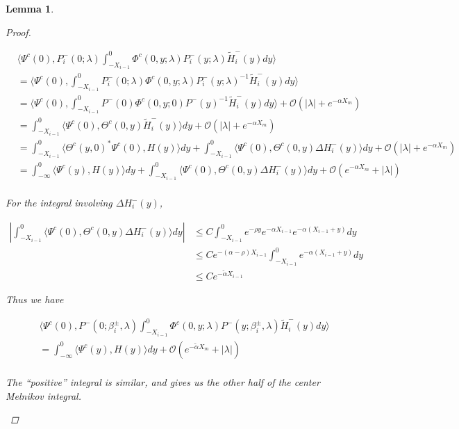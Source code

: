 \documentclass[12pt]{article}
\newtheorem{lemma}{Lemma}
\begin{document}
\begin{lemma}
\begin{proof}
\begin{enumerate}
\begin{align*}
&\langle \Psi^c(0), P_i^-(0; \lambda) \int_{-X_{i-1}}^0 \Phi^c(0, y; \lambda) P_i^-(y; \lambda) \tilde{H}_i^-(y) dy \rangle \\
&= \langle \Psi^c(0), \int_{-X_{i-1}}^0 P_i^-(0; \lambda) \Phi^c(0, y; \lambda) P_i^-(y; \lambda)^{-1} \tilde{H}_i^-(y) dy \rangle \\
&= \langle \Psi^c(0), \int_{-X_{i-1}}^0 P^-(0) \Phi^c(0, y; 0) P^-(y)^{-1} \tilde{H}_i^-(y) dy \rangle + \mathcal{O}(|\lambda| + e^{-\alpha X_m}) \\
&= \int_{-X_{i-1}}^0 \langle \Psi^c(0), \Theta^c(0, y) \tilde{H}_i^-(y) \rangle dy + \mathcal{O}(|\lambda| + e^{-\alpha X_m}) \\
&= \int_{-X_{i-1}}^0 \langle \Theta^c(y, 0)^* \Psi^c(0), H(y) \rangle dy + \int_{-X_{i-1}}^0 \langle \Psi^c(0), \Theta^c(0, y) \Delta H_i^-(y) \rangle dy + \mathcal{O}(|\lambda| + e^{-\alpha X_m}) \\
&= \int_{-\infty}^0 \langle \Psi^c(y), H(y) \rangle dy + \int_{-X_{i-1}}^0 \langle \Psi^c(0), \Theta^c(0, y) \Delta H_i^-(y) \rangle dy + \mathcal{O}(e^{-\alpha X_m} + |\lambda|) \\
\end{align*}

For the integral involving $\Delta H_i^-(y)$,

\begin{align*}
\left| \int_{-X_{i-1}}^0 \langle \Psi^c(0), \Theta^c(0, y) \Delta H_i^-(y) \rangle dy \right| &\leq C \int_{-X_{i-1}}^0 e^{-\rho y} e^{-\alpha X_{i-1}} e^{-\alpha(X_{i-1} + y)} dy \\
&\leq C e^{-(\alpha - \rho)X_{i-1}} \int_{-X_{i-1}}^0 e^{-\alpha(X_{i-1} + y)} dy \\
&\leq C e^{-\tilde{\alpha}X_{i-1}}
\end{align*}

Thus we have

\begin{align*}
&\langle \Psi^c(0), P^-(0; \beta_i^\pm, \lambda) \int_{-X_{i-1}}^0 \Phi^c(0, y; \lambda) P^-(y; \beta_i^\pm, \lambda) \tilde{H}_i^-(y) dy \rangle \\
&= \int_{-\infty}^0 \langle \Psi^c(y), H(y) \rangle dy + \mathcal{O}(e^{-\tilde{\alpha} X_m} + |\lambda|) \\
\end{align*}

The ``positive'' integral is similar, and gives us the other half of the center Melnikov integral.


\end{enumerate}
\end{proof}
\end{lemma}
\end{document}
